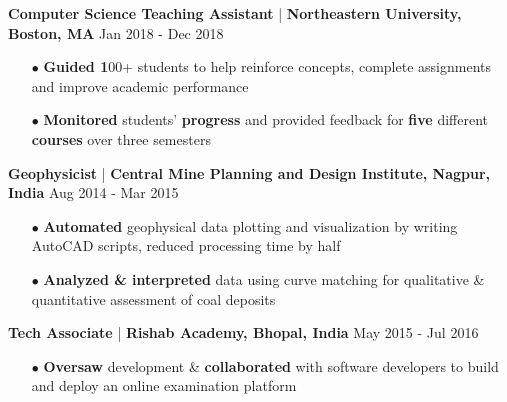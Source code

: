 \documentclass[letterpaper, 10pt, oneside]{article}
\newcommand{\bulltetspace}{\vspace{-0.3em}}
\newcommand{\sectionspace}{\vspace{-1em}}
\begin{document}
\begin{center}
\color{headings}\textbf{Computer Science Teaching Assistant}  | \textbf{Northeastern University, Boston, MA} \hfill Jan 2018 - Dec 2018
\vspace{-0.2em}
\begin{itemize} 
\bulltetspace
\color{text1}
\item[$\bullet$] \textbf{Guided 1}00+ students to help reinforce concepts, complete assignments and improve academic performance\\
\bulltetspace
\item[$\bullet$] \textbf{Monitored} students' \textbf{progress} and provided feedback for \textbf{five} different \textbf{courses} over three semesters\\
\vspace{-0.2em}
\end{itemize}


\color{headings}\textbf{Geophysicist} | \textbf{Central Mine Planning and Design Institute, Nagpur, India} \hfill Aug 2014 - Mar 2015
\color{text1}
\vspace{-0.1em}
\begin{itemize}
\bulltetspace
\item[$\bullet$] \textbf{Automated} geophysical data plotting and visualization by writing AutoCAD scripts, reduced processing time by half\\ 
\bulltetspace
\item[$\bullet$] \textbf{Analyzed \& interpreted} data using curve matching for qualitative \& quantitative assessment of coal deposits\\
\vspace{-0.2em}
\end{itemize}

\color{headings}\textbf{Tech Associate}  | \textbf{Rishab Academy, Bhopal, India} \hfill May 2015 - Jul 2016
\color{text1}
\vspace{-0.2em}
\begin{itemize}
\bulltetspace
\item[$\bullet$]  \textbf{Oversaw} development \& \textbf{collaborated} with software developers to build and deploy an online examination platform\\
\vspace{-0.2em}
\end{itemize}


\end{center}
\vspace{0.1em}
\sectionspace
\end{document}
